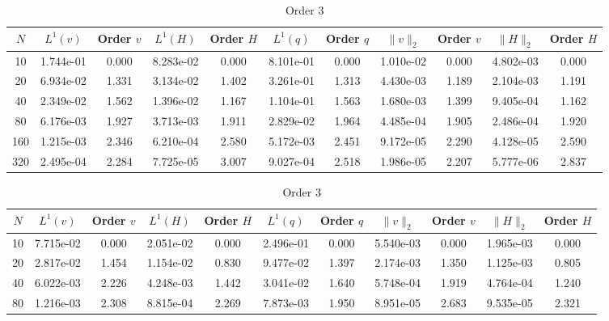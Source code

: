 \documentclass[english]{article}
\theoremstyle{thmstyleone}
\theoremstyle{thmstyletwo}
\theoremstyle{thmstylethree}
\begin{document}
\begin{table}[ht]
	\centering
	\caption{Supercritical Smooth}
	\label{tab:supercritical}
	\begin{adjustbox}{width=1\textwidth}
	\small
		\begin{subtable}{1.\linewidth}
			\centering
			\caption{Order 2}
			\begin{tabular}{ccccccccccc}
				\toprule
				$N$ & $L^1(v)$ & Order $v$ & $L^1(H)$ & Order $H$ & $L^1(q)$ & Order $q$ & $\|v\|_2$ & Order $v$ & $\|H\|_2$ & Order $H$ \\
				\midrule
				10 & 1.744e-01 & 0.000 & 8.283e-02 & 0.000 & 8.101e-01 & 0.000 & 1.010e-02 & 0.000 & 4.802e-03 & 0.000 \\
				20 & 6.934e-02 & 1.331 & 3.134e-02 & 1.402 & 3.261e-01 & 1.313 & 4.430e-03 & 1.189 & 2.104e-03 & 1.191 \\
				40 & 2.349e-02 & 1.562 & 1.396e-02 & 1.167 & 1.104e-01 & 1.563 & 1.680e-03 & 1.399 & 9.405e-04 & 1.162 \\
				80 & 6.176e-03 & 1.927 & 3.713e-03 & 1.911 & 2.829e-02 & 1.964 & 4.485e-04 & 1.905 & 2.486e-04 & 1.920 \\
				160 & 1.215e-03 & 2.346 & 6.210e-04 & 2.580 & 5.172e-03 & 2.451 & 9.172e-05 & 2.290 & 4.128e-05 & 2.590 \\
				320 & 2.495e-04 & 2.284 & 7.725e-05 & 3.007 & 9.027e-04 & 2.518 & 1.986e-05 & 2.207 & 5.777e-06 & 2.837 \\
				\bottomrule
			\end{tabular}
		\end{subtable}
	\end{adjustbox}
	\begin{adjustbox}{width=1\textwidth}
	\small
		\begin{subtable}{1.\linewidth}
			\centering
			\caption{Order 3}
			\begin{tabular}{ccccccccccc}
				\toprule
				$N$ & $L^1(v)$ & Order $v$ & $L^1(H)$ & Order $H$ & $L^1(q)$ & Order $q$ & $\|v\|_2$ & Order $v$ & $\|H\|_2$ & Order $H$ \\
				\midrule
				10 & 7.715e-02 & 0.000 & 2.051e-02 & 0.000 & 2.496e-01 & 0.000 & 5.540e-03 & 0.000 & 1.965e-03 & 0.000 \\
				20 & 2.817e-02 & 1.454 & 1.154e-02 & 0.830 & 9.477e-02 & 1.397 & 2.174e-03 & 1.350 & 1.125e-03 & 0.805 \\
				40 & 6.022e-03 & 2.226 & 4.248e-03 & 1.442 & 3.041e-02 & 1.640 & 5.748e-04 & 1.919 & 4.764e-04 & 1.240 \\
				80 & 1.216e-03 & 2.308 & 8.815e-04 & 2.269 & 7.873e-03 & 1.950 & 8.951e-05 & 2.683 & 9.535e-05 & 2.321 \\

\end{tabular}
\end{subtable}
\end{adjustbox}
\end{table}
\end{document}
